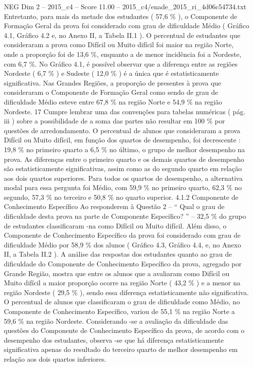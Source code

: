 \begin{textsample}{NEG Dim 2 – 2015\_c4 – Score 11.00 – 2015\_c4/enade\_2015\_ri\_4d06c54734.txt}
Entretanto, para mais da metade dos estudantes ( 57,6 \% ), o Componente de Formação Geral da prova foi considerado com grau de dificuldade Médio ( Gráfico 4.1, Gráfico 4.2 e, no Anexo II, a Tabela II.1 ).
O percentual de estudantes que consideraram a prova como Difícil ou Muito difícil foi maior na região Norte, onde a proporção foi de 13,6 \%, enquanto a de menor incidência foi a Nordeste, com 6,7 \%.
No Gráfico 4.1, é possível observar que a diferença entre as regiões Nordeste ( 6,7 \% ) e Sudeste ( 12,0 \% ) é a única que é estatisticamente significativa.
Nas Grandes Regiões, a proporção de presentes à prova que consideraram o Componente de Formação Geral como sendo de grau de dificuldade Médio esteve entre 67,8 \% na região Norte e 54,9 \% na região Nordeste. 17 Cumpre lembrar uma das convenções para tabelas numéricas ( pág. iii ) sobre a possibilidade de a soma das partes não resultar em 100 \% por questões de arredondamento.
O percentual de alunos que consideraram a prova Difícil ou Muito difícil, em função dos quartos de desempenho, foi decrescente : 19,8 \% no primeiro quarto a 6,5 \% no último, o grupo de melhor desempenho na prova.
As diferenças entre o primeiro quarto e os demais quartos de desempenho são estatisticamente significativas, assim como as do segundo quarto em relação aos dois quartos superiores.
Para todos os quartos de desempenho, a alternativa modal para essa pergunta foi Médio, com 59,9 \% no primeiro quarto, 62,3 \% no segundo, 57,3 \% no terceiro e 50,8 \% no quarto superior. 4.1.2 Componente de Conhecimento Específico Ao responderem à Questão 2 – “ Qual o grau de dificuldade desta prova na parte de Componente Específico? ” – 32,5 \% do grupo de estudantes classificaram -na como Difícil ou Muito difícil.
Além disso, o Componente de Conhecimento Específico da prova foi considerado com grau de dificuldade Médio por 58,9 \% dos alunos ( Gráfico 4.3, Gráfico 4.4, e, no Anexo II, a Tabela II.2 ).
A análise das respostas dos estudantes quanto ao grau de dificuldade do Componente de Conhecimento Específico da prova, agregado por Grande Região, mostra que entre os alunos que a avaliaram como Difícil ou Muito difícil a maior proporção ocorre na região Norte ( 43,2 \% ) e a menor na região Nordeste ( 29,5 \% ), sendo essa diferença estatisticamente não significativa.
O percentual de alunos que classificaram o grau de dificuldade como Médio, no Componente de Conhecimento Específico, variou de 55,1 \% na região Norte a 59,6 \% na região Nordeste.
Considerando -se a avaliação da dificuldade das questões do Componente de Conhecimento Específico da prova, de acordo com o desempenho dos estudantes, observa -se que há diferença estatisticamente significativa apenas do resultado do terceiro quarto de melhor desempenho em relação aos dois quartos inferiores.

\end{textsample}
